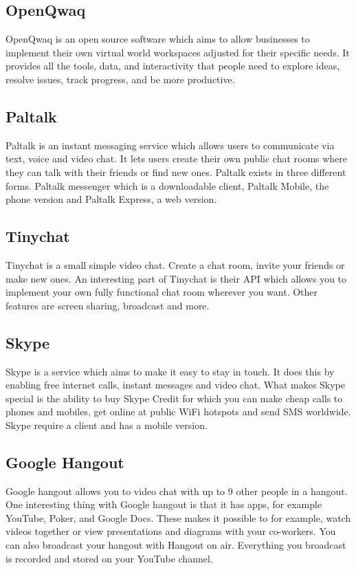 \documentclass[12pt, titlepage]{article}
\begin{document}
\subsection{OpenQwaq}
OpenQwaq\cite{5} is an open source software which aims to allow businesses to implement their own virtual world workspaces adjusted for their specific needs. It provides all the tools, data, and interactivity that people need to explore ideas, resolve issues, track progress, and be more productive.
\subsection{Paltalk}
Paltalk\cite{35} is an instant messaging service which allows users to communicate via text, voice and video chat. It lets users create their own public chat rooms where they can talk with their friends or find new ones. Paltalk exists in three different forms. Paltalk messenger which is a downloadable client, Paltalk Mobile, the phone version and Paltalk Express, a web version.
\subsection{Tinychat}
Tinychat\cite{35} is a small simple video chat. Create a chat room, invite your friends or make new ones. An interesting part of Tinychat is their API which allows you to implement your own fully functional chat room wherever you want. Other features are screen sharing, broadcast and more.
\subsection{Skype}
Skype\cite{10} is a service which aims to make it easy to stay in touch. It does this by enabling free internet calls, instant messages and video chat. What makes Skype special is the ability to buy Skype Credit for which you can make cheap calls to phones and mobiles, get online at public WiFi hotspots and send SMS worldwide. Skype require a client and has a mobile version.
\subsection{Google Hangout}
Google hangout\cite{6} allows you to video chat with up to 9 other people in a hangout. One interesting thing with Google hangout is that it has apps, for example YouTube, Poker, and Google Docs. These makes it possible to for example, watch videos together or view presentations and diagrams with your co-workers. You can also broadcast your hangout with Hangout on air. Everything you broadcast is recorded and stored on your YouTube channel.
\end{document}
